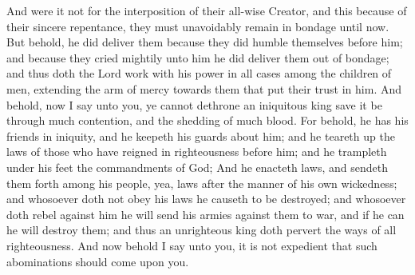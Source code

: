 And were it not for the interposition of their all-wise Creator, and this because of their sincere repentance, they must unavoidably remain in bondage until now.
\bverse \iffalse But behold, he did deliver them because they did humble themselves before him; and because they cried mightily unto him he did deliver them out of bondage; and thus doth the Lord work with his power in all cases among the children of men, extending the arm of mercy towards them that put their trust in him. \fi
But behold, he did deliver them because they did humble themselves before him; and because they cried mightily unto him he did deliver them out of bondage; and thus doth the Lord work with his power in all cases among the children of men, extending the arm of mercy towards them that put their trust in him.
\bverse \iffalse And behold, now I say unto you, ye cannot dethrone an iniquitous king save it be through much contention, and the shedding of much blood. \fi
And behold, now I say unto you, ye cannot dethrone an iniquitous king save it be through much contention, and the shedding of much blood.
\bverse \iffalse For behold, he has his friends in iniquity, and he keepeth his guards about him; and he teareth up the laws of those who have reigned in righteousness before him; and he trampleth under his feet the commandments of God; \fi
For behold, he has his friends in iniquity, and he keepeth his guards about him; and he teareth up the laws of those who have reigned in righteousness before him; and he trampleth under his feet the commandments of God;
\bverse \iffalse And he enacteth laws, and sendeth them forth among his people, yea, laws after the manner of his own wickedness; and whosoever doth not obey his laws he causeth to be destroyed; and whosoever doth rebel against him he will send his armies against them to war, and if he can he will destroy them; and thus an unrighteous king doth pervert the ways of all righteousness. \fi
And he enacteth laws, and sendeth them forth among his people, yea, laws after the manner of his own wickedness; and whosoever doth not obey his laws he causeth to be destroyed; and whosoever doth rebel against him he will send his armies against them to war, and if he can he will destroy them; and thus an unrighteous king doth pervert the ways of all righteousness.
\bverse \iffalse And now behold I say unto you, it is not expedient that such abominations should come upon you. \fi
And now behold I say unto you, it is not expedient that such abominations should come upon you.
